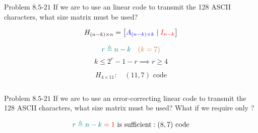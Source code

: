 \begin{frame}{}
  \begin{exampleblock}{Problem $8.5$-$21$}
	If we are to use an  linear code to transmit the 128 ASCII characters,
	what size matrix must be used?
  \end{exampleblock}

  \pause
  \begin{center}
  \end{center}

  \pause
  \[
	H_{(n-k) \times n} = \begin{bmatrix}
	  \textcolor{blue}{A_{(n-k) \times k}} \mid \textcolor{red}{I_{n-k}}
	\end{bmatrix}
  \]

  \pause
  \[
	\textcolor{teal}{r \triangleq n - k} \quad \textcolor{brown}{(k = 7)}
  \]
  \[
	k \le 2^r - 1 - r \implies r \ge 4
  \]

  \pause
  \[
	H_{4 \times 11}: \quad (11, 7) \text{ code}
  \]
\end{frame}

\begin{frame}{}
  \begin{columns}
	  \pause
	  \begin{center}
	  \end{center}
  \end{columns}
\end{frame}

\begin{frame}{}
  \begin{exampleblock}{Problem $8.5$-$21$}
	If we are to use an error-correcting linear code to transmit the 128 ASCII characters,
	what size matrix must be used? What if we require only ?
  \end{exampleblock}

  \pause
  \begin{center}
  \end{center}

  \pause
  \[
	\textcolor{teal}{r \triangleq n - k} \;\textcolor{red}{= 1} \text{ is sufficient}: (8, 7) \text{ code}
  \]
\end{frame}

